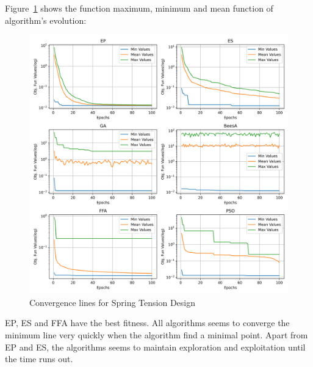 
Figure~\ref{fig:spring_problem_convergence} shows the
function maximum, minimum and mean function of algorithm's evolution:

\begin{figure}[H]
\centering
\caption{Convergence lines for Spring Tension Design}
\label{fig:spring_problem_convergence}
\includegraphics[width=0.4 \textwidth]{images/spring_problem_convergence.png}
\end{figure}

EP, ES and FFA have the best fitness.
All algorithms seems to converge the minimum line very quickly when
the algorithm find a minimal point.
Apart from EP and ES, the algorithms seems to maintain exploration and exploitation
until the time runs out.

